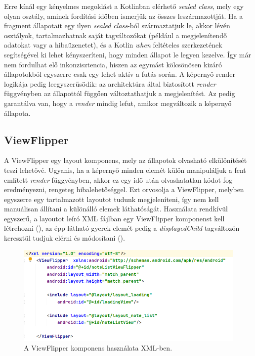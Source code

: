 Erre kínál egy kényelmes megoldást a Kotlinban elérhető \emph{sealed class}, mely egy olyan osztály, aminek fordítási időben ismerjük az összes leszármazottját. Ha a fragment állapotait egy ilyen \emph{sealed class}-ból származtatjuk le, akkor lévén osztályok, tartalmazhatnak saját tagváltozókat (például a megjelenítendő adatokat vagy a hibaüzenetet), és a Kotlin \emph{when} feltételes szerkezetének segítségével ki lehet kényszeríteni, hogy minden állapot le legyen kezelve. Így már nem fordulhat elő inkonzisztencia, hiszen az egymást kölcsönösen kizáró állapotokból egyszerre csak egy lehet aktív a futás során. A képernyő render logikája pedig leegyszerűsödik: az architektúra által biztosított \emph{render} függvényben az állapottól függően változtathatjuk a megjelenítést. Az pedig garantálva van, hogy a \emph{render} mindig lefut, amikor megváltozik a képernyő állapota.

\subsection{ViewFlipper}
A ViewFlipper egy layout komponens, mely az állapotok olvasható elkülönítését teszi lehetővé. \cite{ViewFlipper} Ugyanis, ha a képernyő minden elemét külön manipuláljuk a fent említett \emph{render} függvényben, akkor ez egy idő után olvashatatlan kódot fog eredményezni, rengeteg hibalehetőséggel. Ezt orvosolja a ViewFlipper, melyben egyszerre egy tartalmazott layoutot tudunk megjeleníteni, így nem kell manuálisan állítani a különálló elemek láthatóságát. Használata rendkívül egyszerű, a layoutot leíró XML fájlban egy ViewFlipper komponenst kell létrehozni (), az épp látható gyerek elemét pedig a \emph{displayedChild} tagváltozón keresztül tudjuk elérni és módosítani ().

\begin{figure}[!ht]
	\centering
	\includegraphics[width=150mm, keepaspectratio]{figures/view_flipper_impl.png}
	\caption{A ViewFlipper komponens használata XML-ben.}
	\label{fig:ViewFlipperComponent}
\end{figure}

